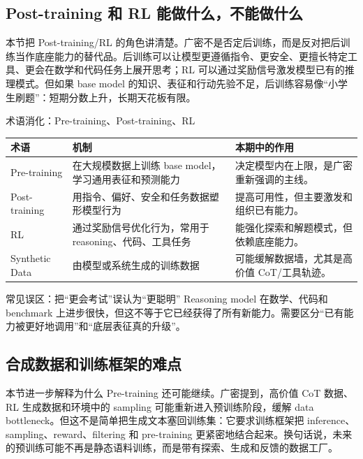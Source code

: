 \subsection{Post-training 和 RL 能做什么，不能做什么}

本节把 Post-training/RL 的角色讲清楚。广密不是否定后训练，而是反对把后训练当作底座能力的替代品。后训练可以让模型更遵循指令、更安全、更擅长特定工具、更会在数学和代码任务上展开思考；RL 可以通过奖励信号激发模型已有的推理模式。但如果 base model 的知识、表征和行动先验不足，后训练容易像“小学生刷题”：短期分数上升，长期天花板有限。

\begin{knowledgebox}{术语消化：Pre-training、Post-training、RL}
\noindent\begin{tabularx}{\textwidth}{p{}p{}X}
\toprule
术语 & 机制 & 本期中的作用 \\
\midrule
Pre-training & 在大规模数据上训练 base model，学习通用表征和预测能力 & 决定模型内在上限，是广密重新强调的主线。 \\
Post-training & 用指令、偏好、安全和任务数据塑形模型行为 & 提高可用性，但主要激发和组织已有能力。 \\
RL & 通过奖励信号优化行为，常用于 reasoning、代码、工具任务 & 能强化探索和解题模式，但依赖底座能力。 \\
Synthetic Data & 由模型或系统生成的训练数据 & 可能缓解数据墙，尤其是高价值 CoT/工具轨迹。 \\
\bottomrule
\end{tabularx}
\end{knowledgebox}

\begin{warningbox}{常见误区：把“更会考试”误认为“更聪明”}
Reasoning model 在数学、代码和 benchmark 上进步很快，但这不等于它已经获得了所有新能力。需要区分“已有能力被更好地调用”和“底层表征真的升级”。
\end{warningbox}

\subsection{合成数据和训练框架的难点}

本节进一步解释为什么 Pre-training 还可能继续。广密提到，高价值 CoT 数据、RL 生成数据和环境中的 sampling 可能重新进入预训练阶段，缓解 data bottleneck。但这不是简单把生成文本塞回训练集：它要求训练框架把 inference、sampling、reward、filtering 和 pre-training 更紧密地结合起来。换句话说，未来的预训练可能不再是静态语料训练，而是带有探索、生成和反馈的数据工厂。

